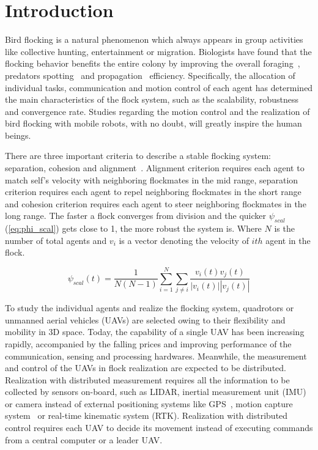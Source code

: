 \chapter{Introduction}\label{introduction}

Bird flocking is a natural phenomenon which always appears in group activities like collective hunting, entertainment or migration. Biologists have found that the flocking behavior benefits the entire colony by improving the overall foraging~\cite{Foraging}, predators spotting~\cite{Predator} and propagation~\cite{Propagation} efficiency. Specifically, the allocation of individual tasks, communication and motion control of each agent has determined the main characteristics of the flock system, such as the scalability, robustness and convergence rate. Studies regarding the motion control and the realization of bird flocking with mobile robots, with no doubt, will greatly inspire the human beings.

There are three important criteria to describe a stable flocking system: separation, cohesion and alignment~\cite{Reynolds1987}. Alignment criterion requires each agent to match self's velocity with neighboring flockmates in the mid range, separation criterion requires each agent to repel neighboring flockmates in the short range and cohesion criterion requires each agent to steer neighboring flockmates in the long range. The faster a flock converges from division and the quicker $\psi_{scal}$ (\ref{eq:phi_scal}) gets close to 1, the more robust the system is. Where $N$ is the number of total agents and $v_i$ is a vector denoting the velocity of $ith$ agent in the flock.

\begin{equation}\label{eq:phi_scal}
\psi_{scal}(t)=\frac{1}{N(N-1)}\sum^N_{i=1}\sum_{j\neq i}\frac{v_i(t)v_j(t)}{|v_i(t)||v_j(t)|}
\end{equation}

To study the individual agents and realize the flocking system, quadrotors or unmanned aerial vehicles (UAVs) are selected owing to their flexibility and mobility in 3D space. Today, the capability of a single UAV has been increasing rapidly, accompanied by the falling prices and improving performance of the communication, sensing and processing hardwares. Meanwhile, the measurement and control of the UAVs in flock realization are expected to be distributed. Realization with distributed measurement requires all the information to be collected by sensors on-board, such as LIDAR, inertial measurement unit (IMU) or camera instead of external positioning systems like GPS~\cite{Vicsek2018}, motion capture system~\cite{Swarm2018} or real-time kinematic system (RTK). Realization with distributed control requires each UAV to decide its movement instead of executing commands from a central computer or a leader UAV.

